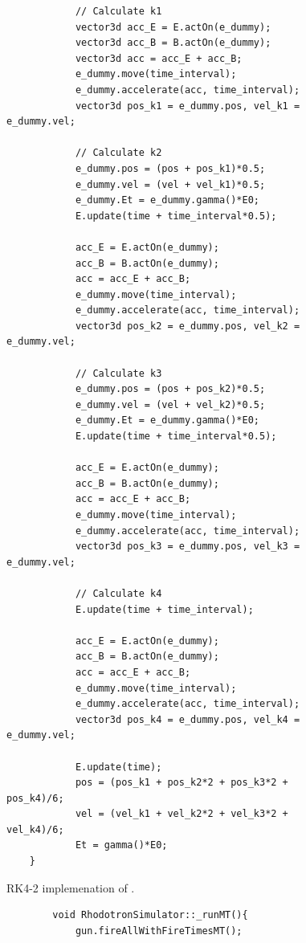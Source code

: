 \documentclass[a4paper,oneside,12pt]{report}
\numberwithin{equation}{chapter}
\begin{document}
{\begin{figure}[H]
\begin{verbatim}
            // Calculate k1
            vector3d acc_E = E.actOn(e_dummy);
            vector3d acc_B = B.actOn(e_dummy);
            vector3d acc = acc_E + acc_B;
            e_dummy.move(time_interval);
            e_dummy.accelerate(acc, time_interval);
            vector3d pos_k1 = e_dummy.pos, vel_k1 = e_dummy.vel;
    
            // Calculate k2
            e_dummy.pos = (pos + pos_k1)*0.5;
            e_dummy.vel = (vel + vel_k1)*0.5;
            e_dummy.Et = e_dummy.gamma()*E0;
            E.update(time + time_interval*0.5);
    
            acc_E = E.actOn(e_dummy);
            acc_B = B.actOn(e_dummy);
            acc = acc_E + acc_B;
            e_dummy.move(time_interval);
            e_dummy.accelerate(acc, time_interval);
            vector3d pos_k2 = e_dummy.pos, vel_k2 = e_dummy.vel;
    
            // Calculate k3
            e_dummy.pos = (pos + pos_k2)*0.5;
            e_dummy.vel = (vel + vel_k2)*0.5;
            e_dummy.Et = e_dummy.gamma()*E0;
            E.update(time + time_interval*0.5);

            acc_E = E.actOn(e_dummy);
            acc_B = B.actOn(e_dummy);
            acc = acc_E + acc_B;
            e_dummy.move(time_interval);
            e_dummy.accelerate(acc, time_interval);
            vector3d pos_k3 = e_dummy.pos, vel_k3 = e_dummy.vel;
    
            // Calculate k4
            E.update(time + time_interval);

            acc_E = E.actOn(e_dummy);
            acc_B = B.actOn(e_dummy);
            acc = acc_E + acc_B;
            e_dummy.move(time_interval);
            e_dummy.accelerate(acc, time_interval);
            vector3d pos_k4 = e_dummy.pos, vel_k4 = e_dummy.vel;
    
            E.update(time);
            pos = (pos_k1 + pos_k2*2 + pos_k3*2 + pos_k4)/6;
            vel = (vel_k1 + vel_k2*2 + vel_k3*2 + vel_k4)/6;
            Et = gamma()*E0;
    }
    \end{verbatim}
    \vspace{0pt}
\caption{RK4-2 implemenation of \eEM.}
\label{fig:rk2_EM}
\end{figure}

\begin{figure}[H]
    \centering
    \begin{verbatim}
        void RhodotronSimulator::_runMT(){
            gun.fireAllWithFireTimesMT();
        

\end{verbatim}
\end{figure}}
\end{document}
